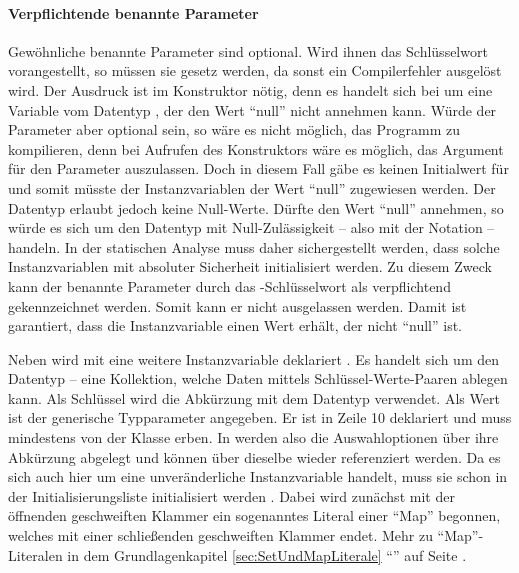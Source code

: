 \paragraph{Verpflichtende benannte Parameter}

Gewöhnliche benannte Parameter sind optional.
Wird ihnen das Schlüsselwort  vorangestellt, so müssen sie gesetz werden,
da sonst ein Compilerfehler ausgelöst wird.
Der Ausdruck  ist im Konstruktor nötig, denn es handelt sich bei  um eine Variable vom Datentyp ,
der den Wert \enquote{null} nicht annehmen kann.
Würde der Parameter aber optional sein, so wäre es nicht möglich, das Programm zu kompilieren,
denn bei Aufrufen des Konstruktors wäre es möglich, das Argument für den Parameter auszulassen.
Doch in diesem Fall gäbe es keinen Initialwert für  und somit müsste der Instanzvariablen der Wert \enquote{null} zugewiesen werden.
Der Datentyp  erlaubt jedoch keine Null-Werte.
Dürfte  den Wert \enquote{null} annehmen, so würde es sich um den Datentyp  mit Null-Zulässigkeit -- also mit der Notation  -- handeln.
In der statischen Analyse muss daher sichergestellt werden,
dass solche Instanzvariablen mit absoluter Sicherheit initialisiert werden.
Zu diesem Zweck kann der benannte Parameter durch das -Schlüsselwort als verpflichtend gekennzeichnet werden.
Somit kann er nicht ausgelassen werden.
Damit ist garantiert, dass die Instanzvariable  einen Wert erhält,  der nicht \enquote{null} ist.  

Neben  wird mit  eine weitere Instanzvariable deklariert .
Es handelt sich um den Datentyp  -- eine Kollektion, welche Daten mittels Schlüssel-Werte-Paaren ablegen kann. 
Als Schlüssel wird die Abkürzung mit dem Datentyp  verwendet.
Als Wert ist der generische Typparameter  angegeben.
Er ist in Zeile 10 deklariert und muss mindestens von der Klasse  erben.
In  werden also die Auswahloptionen über  ihre Abkürzung abgelegt und können über dieselbe wieder referenziert werden.
 Da es sich auch hier um eine unveränderliche Instanzvariable handelt, muss sie schon in der Initialisierungsliste initialisiert werden .
Dabei wird zunächst mit der öffnenden geschweiften Klammer  ein sogenanntes Literal einer \enquote{Map}  begonnen, welches mit einer schließenden geschweiften Klammer  endet.
Mehr zu \enquote{Map}-Literalen in dem Grundlagenkapitel \ref{sec:SetUndMapLiterale} \enquote{} auf Seite \pageref{sec:SetUndMapLiterale}.



